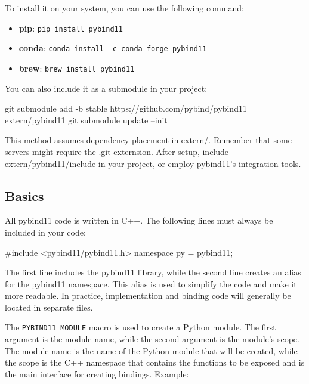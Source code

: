To install it on your system, you can use the following command:

\begin{itemize}
    \item \textbf{pip}: \phantom{wcoi} \texttt{pip install pybind11}

    \item \textbf{conda}: \phantom{w} \texttt{conda install -c conda-forge pybind11}

    \item \textbf{brew}: \phantom {da.} \texttt{brew install pybind11}

\end{itemize}

You can also include it as a submodule in your project:

\begin{codeblock}[language=bash]
git submodule add -b stable https://github.com/pybind/pybind11 extern/pybind11
git submodule update --init 
\end{codeblock}

This method assumes dependency placement in extern/. Remember that some servers might require the .git externsion.
After setup, include extern/pybind11/include in your project, or employ pybind11's integration tools.

\subsection{Basics}

All pybind11 code is written in C++. The following lines must always be included in your code:

\begin{codeblock}[language=C++]
#include <pybind11/pybind11.h>
namespace py = pybind11;
\end{codeblock}

The first line includes the pybind11 library, while the second line creates an alias for the pybind11 namespace. This alias is used to simplify the code and make it more readable.
In practice, implementation and binding code will generally be located in separate files.

The \texttt{PYBIND11\_MODULE} macro is used to create a Python module. The first argument is the module name, while the second argument is the module's scope. The module name is the name of the Python module that will be created, while the scope is the C++ namespace that contains the functions to be exposed and is the main interface for creating bindings.
Example:

